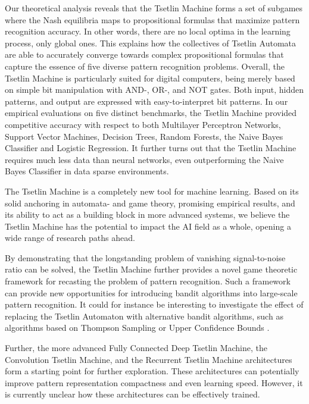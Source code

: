 \documentclass[11pt,a4paper]{article}
\begin{document}
Our theoretical analysis reveals that the Tsetlin Machine forms a set of subgames where the Nash equilibria maps to propositional formulas that maximize pattern recognition accuracy. In other words, there are no local optima in the learning process, only global ones. This explains how the collectives of Tsetlin Automata are able to accurately converge towards complex propositional formulas that capture the essence of five diverse pattern recognition problems.  Overall, the Tsetlin Machine is particularly suited for digital computers, being merely based on simple bit manipulation with AND-, OR-, and NOT gates. Both input, hidden patterns, and output are expressed with easy-to-interpret bit patterns. In our empirical evaluations on five distinct benchmarks, the Tsetlin Machine provided competitive accuracy with respect to both Multilayer Perceptron Networks, Support Vector Machines, Decision Trees, Random Forests, the Naive Bayes Classifier and Logistic Regression. It further turns out that the Tsetlin Machine requires much less data than neural networks, even outperforming the Naive Bayes Classifier in data sparse environments. 

The Tsetlin Machine is a completely new tool for machine learning. Based on its solid anchoring in automata- and game theory, promising empirical results, and its ability to act as a building block in more advanced systems, we believe the Tsetlin Machine has the potential to impact the AI field as a whole, opening a wide range of research paths ahead.

By demonstrating that the longstanding problem of vanishing signal-to-noise ratio can be solved, the Tsetlin Machine further provides a novel game theoretic framework for recasting the problem of pattern recognition. Such a framework can provide new opportunities for introducing bandit algorithms into large-scale pattern recognition. It could for instance be interesting to investigate the effect of replacing the Tsetlin Automaton with alternative bandit algorithms, such as algorithms based on Thompson Sampling \cite{Thompson1933,Granmo2010f,May2012,Chapelle2011} or Upper Confidence Bounds \cite{Auer2003}. 

Further, the more advanced Fully Connected Deep Tsetlin Machine, the Convolution Tsetlin Machine, and the Recurrent Tsetlin Machine architectures form a starting point for further exploration. These architectures can potentially improve pattern representation compactness and even learning speed. However, it is currently unclear how these architectures can be effectively trained.
\end{document}
